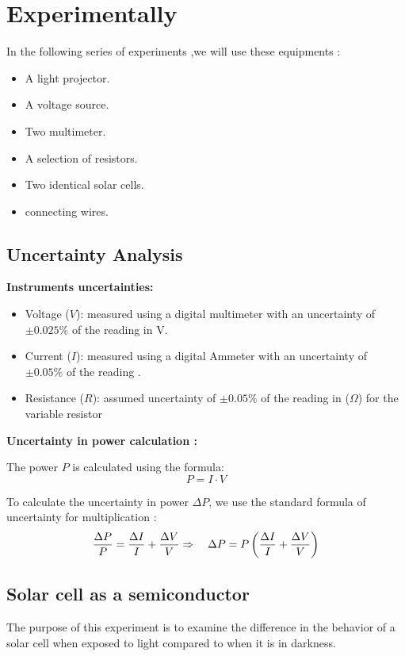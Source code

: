 \documentclass[12pt]{article}
\begin{document}
\section{Experimentally}

In the following  series of experiments ,we will use these equipments :
\begin{itemize}
    \item A light projector.
    \item A voltage source.
    \item Two multimeter.
    \item A selection of resistors.
    \item Two identical solar cells.
    \item connecting wires.
\end{itemize}

\subsection{Uncertainty Analysis}
\textbf{Instruments uncertainties:}\cite{manual}

\begin{itemize}
    \item Voltage (\( V \)): measured using a digital multimeter with an uncertainty of \( \pm 0.025 \%  \) of the reading in V.
    \item Current (\( I \)): measured using a digital Ammeter with an uncertainty of \( \pm 0.05\%  \) of the reading .
    \item Resistance (\( R \)): assumed uncertainty of \( \pm 0.05\% \) of the reading in (\( \Omega \))  for the variable resistor
\end{itemize}


\textbf{Uncertainty in power calculation :}

The power  \( P \) is calculated using the formula:
\[
P = I \cdot V
\]

To calculate the uncertainty in power \( \Delta P \), we use the standard formula of uncertainty for multiplication \cite{squires}:
\begin{equation}
\frac{\Delta P}{P} = \frac{\Delta I}{I} + \frac{\Delta V}{V} \\
\Rightarrow \quad
\Delta P = P \left( \frac{\Delta I}{I} + \frac{\Delta V}{V} \right)
\label{eq:delta P}
\end{equation}




\subsection{Solar cell as a semiconductor}
The purpose of this experiment is to examine the difference in the behavior of a solar cell when exposed to light compared to when it is in darkness.
\newline
\end{document}
